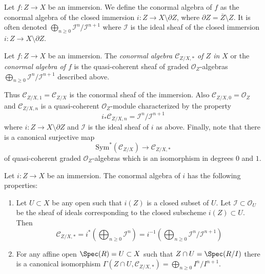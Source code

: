 \medskip\noindent
Let $f : Z \to X$ be an immersion. We define the conormal algebra of $f$
as the conormal algebra of the closed immersion
$i : Z \to X \setminus \partial Z$, where
$\partial Z = \overline{Z} \setminus Z$. It is often denoted
$\bigoplus_{n \geq 0} \mathcal{I}^n/\mathcal{I}^{n + 1}$
where $\mathcal{I}$ is the ideal sheaf
of the closed immersion $i : Z \to X \setminus \partial Z$.

\begin{definition}
\label{definition-conormal-sheaf}
Let $f : Z \to X$ be an immersion. The {\it conormal algebra
$\mathcal{C}_{Z/X, *}$ of $Z$ in $X$} or the {\it conormal algebra of $f$}
is the quasi-coherent sheaf of graded $\mathcal{O}_Z$-algebras
$\bigoplus_{n \geq 0} \mathcal{I}^n/\mathcal{I}^{n + 1}$ described above.
\end{definition}

\noindent
Thus $\mathcal{C}_{Z/X, 1} = \mathcal{C}_{Z/X}$ is the conormal sheaf
of the immersion. Also $\mathcal{C}_{Z/X, 0} = \mathcal{O}_Z$ and
$\mathcal{C}_{Z/X, n}$ is a quasi-coherent $\mathcal{O}_Z$-module
characterized by the property
\begin{equation}
\label{equation-conormal-in-degree-n}
i_*\mathcal{C}_{Z/X, n} = \mathcal{I}^n/\mathcal{I}^{n + 1}
\end{equation}
where $i : Z \to X \setminus \partial Z$ and $\mathcal{I}$ is the ideal
sheaf of $i$ as above. Finally, note that there is a canonical surjective
map
\begin{equation}
\label{equation-conormal-algebra-quotient}
\text{Sym}^*(\mathcal{C}_{Z/X}) \longrightarrow \mathcal{C}_{Z/X, *}
\end{equation}
of quasi-coherent graded $\mathcal{O}_Z$-algebras which is an isomorphism
in degrees $0$ and $1$.

\begin{lemma}
\label{lemma-affine-conormal-sheaf}
Let $i : Z \to X$ be an immersion. The conormal algebra
of $i$ has the following properties:
\begin{enumerate}
\item Let $U \subset X$ be any open such that $i(Z)$ is
a closed subset of $U$. Let $\mathcal{I} \subset \mathcal{O}_U$
be the sheaf of ideals corresponding to the closed subscheme
$i(Z) \subset U$. Then
$$
\mathcal{C}_{Z/X, *} =
i^*\left(\bigoplus\nolimits_{n \geq 0} \mathcal{I}^n\right) =
i^{-1}\left(
\bigoplus\nolimits_{n \geq 0} \mathcal{I}^n/\mathcal{I}^{n + 1}
\right)
$$
\item
For any affine open $\Spec(R) = U \subset X$
such that $Z \cap U = \Spec(R/I)$ there is a
canonical isomorphism
$\Gamma(Z \cap U, \mathcal{C}_{Z/X, *}) = \bigoplus_{n \geq 0} I^n/I^{n + 1}$.
\end{enumerate}
\end{lemma}

